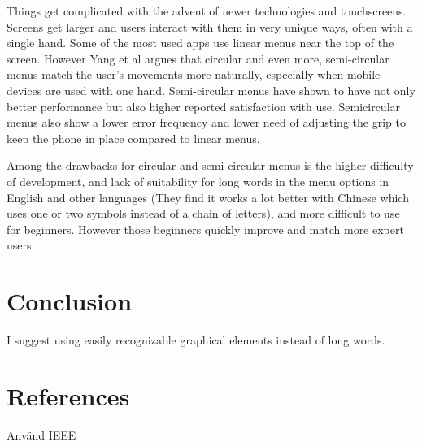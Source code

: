 \documentclass{article}
\begin{document}
Things get complicated with the advent of newer technologies and touchscreens. Screens get larger and users interact with them in very unique ways, often with a single hand. Some of the most used apps use linear menus near the top of the screen. However Yang et al argues that circular and even more, semi-circular menus match the user's movements more naturally, especially when mobile devices are used with one hand. Semi-circular menus have shown to have not only better performance but also higher reported satisfaction with use. Semicircular menus also show a lower error frequency and lower need of adjusting the grip to keep the phone in place compared to linear menus.

Among the drawbacks for circular and semi-circular menus is the higher difficulty of development, and lack of suitability for long words in the menu options in English and other languages (They find it works a lot better with Chinese which uses one or two symbols instead of a chain of letters), and more difficult to use for beginners. However those beginners quickly improve and match more expert users.


\section{Conclusion}

I suggest using easily recognizable graphical elements instead of long words.


\section{References}
Använd IEEE
\end{document}
